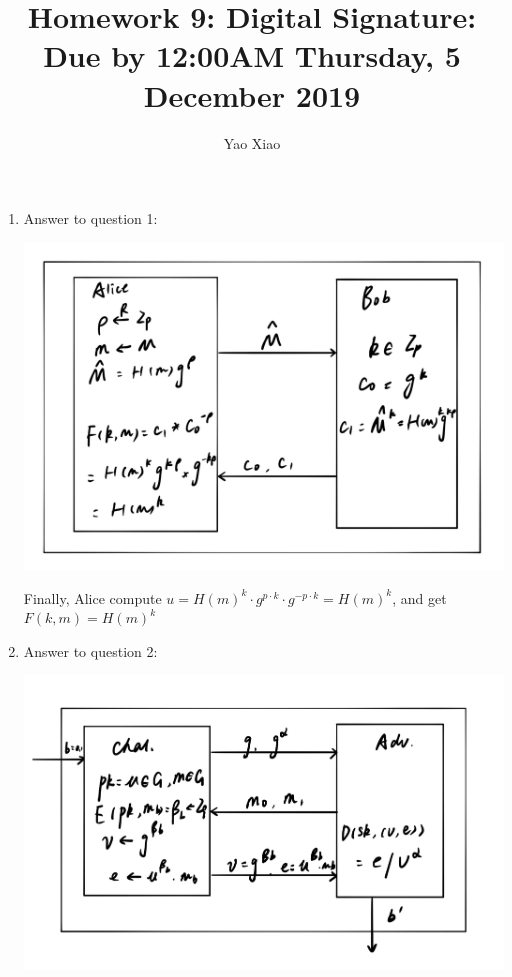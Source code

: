 \documentclass[11pt]{article}
\begin{document}
\author{Yao Xiao}
\title{Homework 9: Digital Signature: Due by 12:00AM Thursday, 5 December 2019}
\maketitle

\medskip

\begin{enumerate}

\item
Answer to question 1:

\includegraphics[scale=0.3]{S1.jpeg}

Finally, Alice compute $u = H(m)^k \cdot g^{p \cdot k} \cdot g^{-p \cdot k} = H(m)^k$, and get $F(k,m) = H(m)^k$


\item
Answer to question 2:

\includegraphics[scale=0.3]{S2.jpeg}


\end{enumerate}
\end{document}
